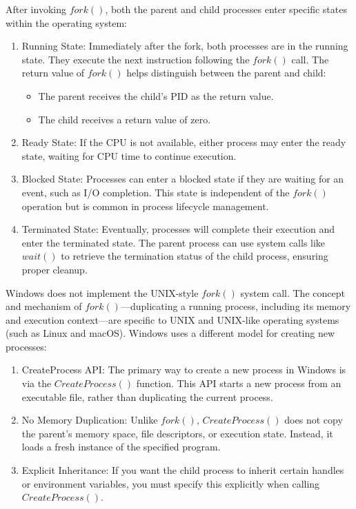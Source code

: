 \documentclass[titlepage]{article}\pagestyle{empty}
\begin{document}
After invoking $fork()$, both the parent and child processes enter specific states within the operating system:
\begin{enumerate}
  \item Running State: Immediately after the fork, both processes are in the running state. They execute the next instruction following the $fork()$ call. The return value of $fork()$ helps distinguish between the parent and child:
    \begin{itemize}
      \item The parent receives the child's PID as the return value.
      \item The child receives a return value of zero.
    \end{itemize}
  \item Ready State: If the CPU is not available, either process may enter the ready state, waiting for CPU time to continue execution.
  \item Blocked State: Processes can enter a blocked state if they are waiting for an event, such as I/O completion. This state is independent of the $fork()$ operation but is common in process lifecycle management.
  \item Terminated State: Eventually, processes will complete their execution and enter the terminated state. The parent process can use system calls like $wait()$ to retrieve the termination status of the child process, ensuring proper cleanup.
\end{enumerate}
Windows does not implement the UNIX-style $fork()$ system call. The concept and mechanism of $fork()$—duplicating a running process, including its memory and execution context—are specific to UNIX and UNIX-like operating systems (such as Linux and macOS).
Windows uses a different model for creating new processes:

\begin{enumerate}
  \item CreateProcess API:
The primary way to create a new process in Windows is via the $CreateProcess()$ function. This API starts a new process from an executable file, rather than duplicating the current process.


  \item No Memory Duplication:
Unlike $fork()$, $CreateProcess()$ does not copy the parent’s memory space, file descriptors, or execution state. Instead, it loads a fresh instance of the specified program.


  \item Explicit Inheritance:
If you want the child process to inherit certain handles or environment variables, you must specify this explicitly when calling $CreateProcess()$.
\end{enumerate}
\end{document}
